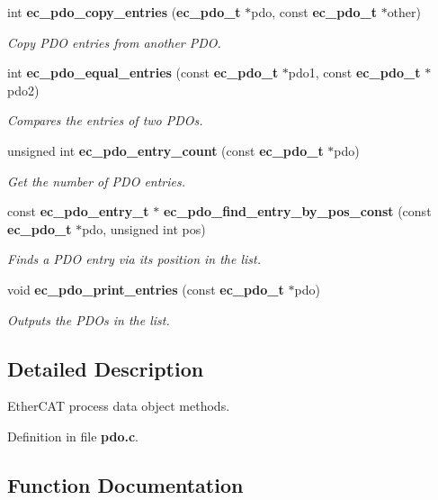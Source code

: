 \begin{DoxyCompactItemize}
int {\bf ec\-\_\-pdo\-\_\-copy\-\_\-entries} ({\bf ec\-\_\-pdo\-\_\-t} $\ast$pdo, const {\bf ec\-\_\-pdo\-\_\-t} $\ast$other)
\begin{DoxyCompactList}\small\item\em \-Copy \-P\-D\-O entries from another \-P\-D\-O. \end{DoxyCompactList}\item 
int {\bf ec\-\_\-pdo\-\_\-equal\-\_\-entries} (const {\bf ec\-\_\-pdo\-\_\-t} $\ast$pdo1, const {\bf ec\-\_\-pdo\-\_\-t} $\ast$pdo2)
\begin{DoxyCompactList}\small\item\em \-Compares the entries of two \-P\-D\-Os. \end{DoxyCompactList}\item 
unsigned int {\bf ec\-\_\-pdo\-\_\-entry\-\_\-count} (const {\bf ec\-\_\-pdo\-\_\-t} $\ast$pdo)
\begin{DoxyCompactList}\small\item\em \-Get the number of \-P\-D\-O entries. \end{DoxyCompactList}\item 
const {\bf ec\-\_\-pdo\-\_\-entry\-\_\-t} $\ast$ {\bf ec\-\_\-pdo\-\_\-find\-\_\-entry\-\_\-by\-\_\-pos\-\_\-const} (const {\bf ec\-\_\-pdo\-\_\-t} $\ast$pdo, unsigned int pos)
\begin{DoxyCompactList}\small\item\em \-Finds a \-P\-D\-O entry via its position in the list. \end{DoxyCompactList}\item 
void {\bf ec\-\_\-pdo\-\_\-print\-\_\-entries} (const {\bf ec\-\_\-pdo\-\_\-t} $\ast$pdo)
\begin{DoxyCompactList}\small\item\em \-Outputs the \-P\-D\-Os in the list. \end{DoxyCompactList}\end{DoxyCompactItemize}


\subsection{\-Detailed \-Description}
\-Ether\-C\-A\-T process data object methods. 

\-Definition in file {\bf pdo.\-c}.



\subsection{\-Function \-Documentation}
